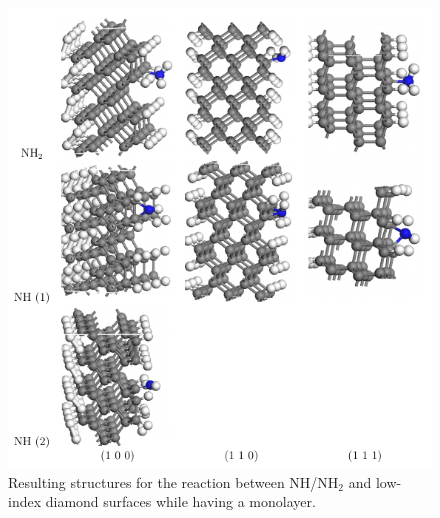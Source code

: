 \documentclass[12pt,a4paper]{article}
\begin{document}
\begin{figure} \captionsetup{width=.8\linewidth}  \caption{Resulting structures for the reaction between NH/NH$_2$ and low-index diamond surfaces while having a monolayer.} \label{highcoverae}
\includegraphics[width=.8\linewidth]{pictures/singleSite_result.png}
\end{figure}



\printbibliography
\end{document}
